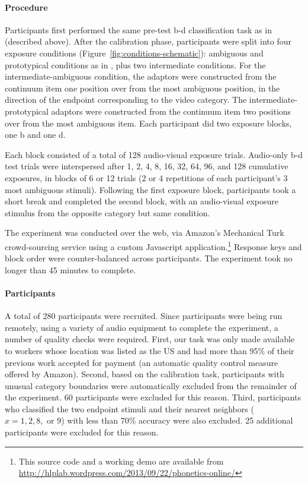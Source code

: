 \paragraph{Procedure}
\label{sec:procedure}

Participants first performed the same pre-test \ph b-\ph d classification task as in \textcite{Vroomen2007} (described above).
After the calibration phase, participants were split into four exposure conditions (Figure~\ref{fig:conditions-schematic}): ambiguous and prototypical conditions as in \textcite{Vroomen2007}, plus two intermediate conditions. For the intermediate-ambiguous condition, the adaptors were constructed from the continuum item one position over from the most ambiguous position, in the direction of the endpoint corresponding to the video category.  The intermediate-prototypical adaptors were constructed from the continuum item two positions over from the most ambiguous item.  Each participant did two exposure blocks, one \ph b and one \ph d.

Each block consisted of a total of 128 audio-visual exposure trials.  Audio-only \ph b-\ph d test trials were interspersed after 1, 2, 4, 8, 16, 32, 64, 96, and 128 cumulative exposures, in blocks of 6 or 12 trials (2 or 4 repetitions of each participant's 3 most ambiguous stimuli).  Following the first exposure block, participants took a short break and completed the second block, with an audio-visual exposure stimulus from the opposite category but same condition.

The experiment was conducted over the web, via Amazon's Mechanical Turk crowd-sourcing service using a custom Javascript application.\footnote{This source code and a working demo are available from \url{http://hlplab.wordpress.com/2013/09/22/phonetics-online/}}  Response keys and block order were counter-balanced across participants.  The experiment took no longer than 45 minutes to complete.

\paragraph{Participants}
\label{sec:participants}

A total of 280 participants were recruited.  Since participants were being run remotely, using a variety of audio equipment to complete the experiment, a number of quality checks were required.  First, our task was only made available to workers whose location was listed as the US and had more than 95\% of their previous work accepted for payment (an automatic quality control measure offered by Amazon).  Second, based on the calibration task, participants with unusual category boundaries \autocite[most ambiguous stimulus not one of the middle three positions 4, 5, or 6 found by][]{Vroomen2007} were automatically excluded from the remainder of the experiment.  60 participants were excluded for this reason.  Third, participants who classified the two endpoint stimuli and their nearest neighbors ($x=1,2,8,\textrm{ or } 9$) with less than 70\% accuracy were also excluded.  25 additional participants were excluded for this reason.

